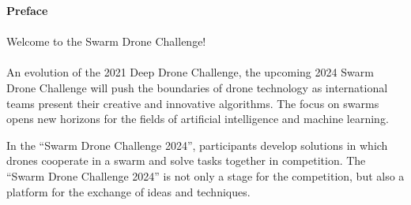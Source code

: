 


\newpage
{\bf Preface}
\\ \\ Welcome to the Swarm Drone Challenge! \\ \\
An evolution of the 2021 Deep Drone Challenge, the upcoming 2024 Swarm Drone Challenge will push the boundaries of drone technology as international teams present their creative and innovative algorithms. The focus on swarms opens new horizons for the fields of artificial intelligence and machine learning.

In the “Swarm Drone Challenge 2024”, participants develop solutions in which drones cooperate in a swarm and solve tasks together in competition. The “Swarm Drone Challenge 2024” is not only a stage for the competition, but also a platform for the exchange of ideas and techniques.

\newpage



